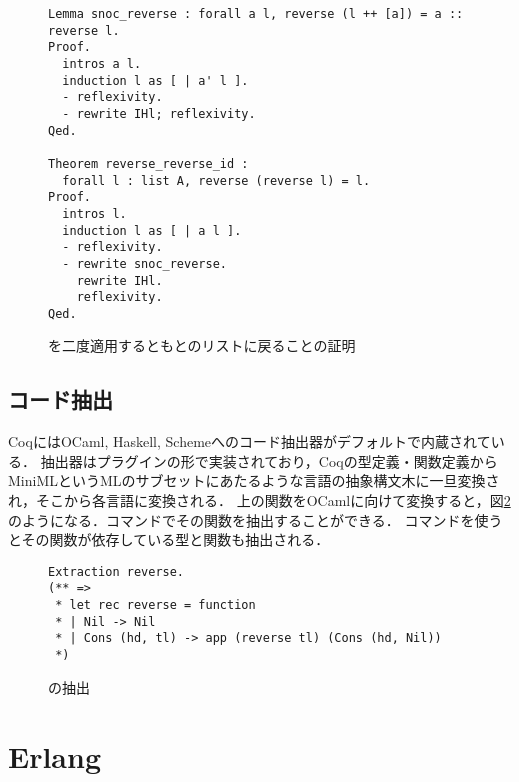 \begin{figure}
\begin{lstlisting}
Lemma snoc_reverse : forall a l, reverse (l ++ [a]) = a :: reverse l.
Proof.
  intros a l.
  induction l as [ | a' l ].
  - reflexivity.
  - rewrite IHl; reflexivity.
Qed.

Theorem reverse_reverse_id :
  forall l : list A, reverse (reverse l) = l.
Proof.
  intros l.
  induction l as [ | a l ].
  - reflexivity.
  - rewrite snoc_reverse.
    rewrite IHl.
    reflexivity.
Qed.
\end{lstlisting}
\caption{を二度適用するともとのリストに戻ることの証明}\label{code:background:reverse-reverse}
\end{figure}


\subsection{コード抽出}

CoqにはOCaml, Haskell, Schemeへのコード抽出器がデフォルトで内蔵されている．
抽出器はプラグインの形で実装されており，Coqの型定義・関数定義からMiniMLというMLのサブセットにあたるような言語の抽象構文木に一旦変換され，そこから各言語に変換される．
上の関数をOCamlに向けて変換すると，図\ref{code:background:reverse-erl}のようになる．コマンドでその関数を抽出することができる．
コマンドを使うとその関数が依存している型と関数も抽出される．

\begin{figure}
\begin{lstlisting}
Extraction reverse.
(** =>
 * let rec reverse = function
 * | Nil -> Nil
 * | Cons (hd, tl) -> app (reverse tl) (Cons (hd, Nil))
 *)
\end{lstlisting}
\caption{の抽出}\label{code:background:reverse-erl}
\end{figure}



\section{Erlang}


